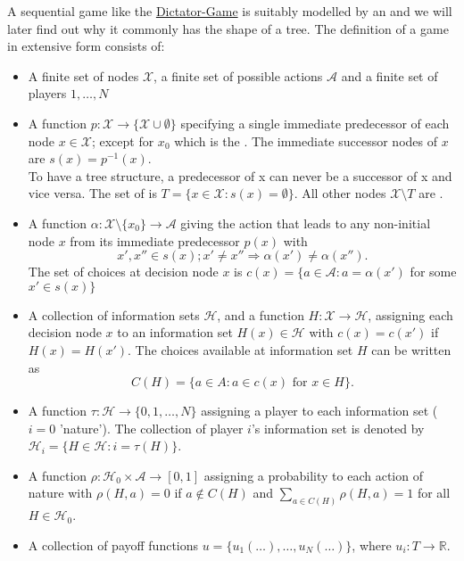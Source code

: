 \begin{definition}
	A sequential game like the \hyperref[Dictator-Game]{Dictator-Game} is suitably modelled by an  and we will later find out why it commonly has the shape of a tree. The definition of a game in extensive form consists of:
\begin{itemize}  
	\item A finite set of nodes $\mathcal{X}$, a finite set of possible actions $\mathcal{A}$ and a finite set of players ${1, \dotsc, N}$
	\item A function $p \colon \mathcal{X} \rightarrow \{ \mathcal{X} \cup \emptyset \}$ specifying a single immediate predecessor of each node $x \in \mathcal{X}$; except for $x_{0}$ which is the . The immediate successor nodes of $x$ are $s(x) = p^{-1}(x)$. \\
		To have a tree structure, a predecessor of x can never be a successor of x and vice versa. The set of  is $T = \{ x \in \mathcal{X}: s(x) = \emptyset \}$. All other nodes $\mathcal{X} \setminus T$ are .
	\item A function $\alpha \colon \mathcal{X} \setminus \{ x_{0} \} \rightarrow \mathcal{A}$ giving the action that leads to any non-initial node $x$ from its immediate predecessor $p(x)$ with
		\[ x', x'' \in s(x); x' \neq x'' \Rightarrow \alpha(x') \neq \alpha(x''). \]
		The set of choices at decision node $x$ is $c(x) = \{ a \in \mathcal{A} : a = \alpha(x')$ for some $x' \in s(x) \}$
	\item A collection of information sets $\mathcal{H}$, and a function $H : \mathcal{X} \rightarrow \mathcal{H}$, assigning each decision node $x$ to an information set $H(x) \in \mathcal{H}$ with $c(x) = c(x')$ if $H(x) = H(x')$.
		The choices available at information set $H$ can be written as
		\[ C(H) = \{a \in A : a \in c(x) \text{ for } x \in H \}. \]
	\item A function $\tau : \mathcal{H} \rightarrow \{0, 1, \dotsc, N \}$ assigning a player to each information set ($i = 0$ 'nature').
		The collection of player $i$'s information set is denoted by $\mathcal{H}_i = \{H \in \mathcal{H} : i = \tau(H) \}$.
	\item A function $\rho : \mathcal{H}_{0} \times \mathcal{A} \rightarrow [0, 1]$ assigning a probability to each action of nature with $ \rho (H,a) = 0$ if $a \notin C(H)$ and $\sum_{a \in C(H)} \rho(H,a) = 1$ for all $H \in \mathcal{H}_{0}$.
	\item A collection of payoff functions $u = \{ u_{1}(\dotsc), \dotsc, u_{N} (\dotsc) \}$, where $u_{i} \colon T \rightarrow \mathds{R}$.
\end{itemize}
\end{definition}

